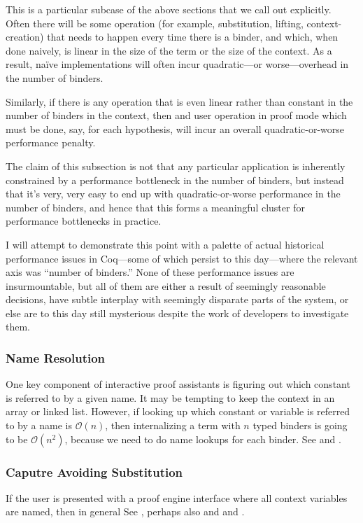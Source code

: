 This is a particular subcase of the above sections that we call out explicitly.
Often there will be some operation (for example, substitution, lifting, context-creation) that needs to happen every time there is a binder, and which, when done naively, is linear in the size of the term or the size of the context.
As a result, na\"ive implementations will often incur quadratic---or worse---overhead in the number of binders.


Similarly, if there is any operation that is even linear rather than constant in the number of binders in the context, then and user operation in proof mode which must be done, say, for each hypothesis, will incur an overall quadratic-or-worse performance penalty.

The claim of this subsection is not that any particular application is inherently constrained by a performance bottleneck in the number of binders, but instead that it's very, very easy to end up with quadratic-or-worse performance in the number of binders, and hence that this forms a meaningful cluster for performance bottlenecks in practice.

I will attempt to demonstrate this point with a palette of actual historical performance issues in Coq---some of which persist to this day---where the relevant axis was ``number of binders.''
None of these performance issues are insurmountable, but all of them are either a result of seemingly reasonable decisions, have subtle interplay with seemingly disparate parts of the system, or else are to this day still mysterious despite the work of developers to investigate them.

\subsubsection{Name Resolution}
One key component of interactive proof assistants is figuring out which constant is referred to by a given name.
It may be tempting to keep the context in an array or linked list.
However, if looking up which constant or variable is referred to by a name is $\mathcal O(n)$, then internalizing a term with $n$ typed binders is going to be $\mathcal O(n^2)$, because we need to do name lookups for each binder.
See  and .

\subsubsection{Caputre Avoiding Substitution}
If the user is presented with a proof engine interface where all context variables are named, then in general 
See , perhaps also  and  and .

